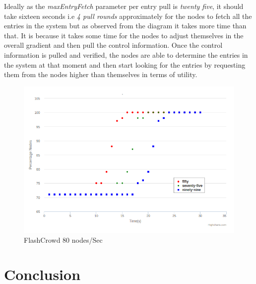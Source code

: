 \documentclass[12pt,a4paper,twoside,openright]{book}
\begin{document}
\par Ideally as the \textit{maxEntryFetch} parameter per entry pull is \textit{twenty five}, it should take sixteen seconds i.e \textit{4 pull rounds} approximately for the nodes to fetch all the entries in the system but as observed from the diagram it takes more time than that. It is because it takes some time for the nodes to adjust themselves in the overall gradient and then pull the control information. Once the control information is pulled and verified, the nodes are able to determine the entries in the system at that moment and then start looking for the entries by requesting them from the nodes higher than themselves in terms of utility.

\begin{figure}[h]
	\includegraphics[scale=0.5]{200-80Nodes}
	\caption{FlashCrowd 80 nodes/Sec }
	\label{fig:flash80}
\end{figure}



\chapter{Conclusion}
\label{chap:conclusion}
\end{document}
